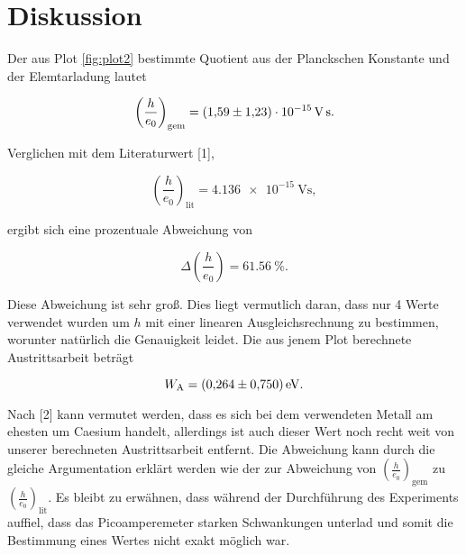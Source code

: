\section{Diskussion}
\label{sec:Diskussion}

Der aus Plot \ref{fig:plot2} bestimmte Quotient aus der Planckschen Konstante und der Elemtarladung lautet 

\begin{equation*}
\left(\frac{h}{e_0}\right)_\text{gem} = \SI{1.59+-1.23e-15}{\volt\second}.
\end{equation*}

Verglichen mit dem Literaturwert [1],

\begin{equation*}
\left(\frac{h}{e_0}\right)_\text{lit} = \SI{4.136e-15}{\volt\second},
\end{equation*}

ergibt sich eine prozentuale Abweichung von

\begin{equation*}
\Delta\left(\frac{h}{e_0}\right) = \SI{61.56}{\percent}.
\end{equation*}

Diese Abweichung ist sehr groß. Dies liegt vermutlich daran, dass nur 4 Werte 
verwendet wurden um $h$ mit einer linearen Ausgleichsrechnung zu bestimmen, worunter
natürlich die Genauigkeit leidet. 
Die aus jenem Plot berechnete Austrittsarbeit beträgt 

\begin{equation*}
W_\text{A} = \SI{0.264+-0.750}{\eV}.
\end{equation*}

Nach [2] kann vermutet werden, dass es sich bei dem verwendeten Metall am ehesten um 
Caesium handelt, allerdings ist auch dieser Wert noch recht weit von unserer berechneten
Austrittsarbeit entfernt. Die Abweichung kann durch die gleiche Argumentation erklärt werden
wie der zur Abweichung von $\left(\frac{h}{e_0}\right)_\text{gem}$ zu $\left(\frac{h}{e_0}\right)_\text{lit}$.
Es bleibt zu erwähnen, dass während der Durchführung des Experiments auffiel, dass das Picoamperemeter
starken Schwankungen unterlad und somit die Bestimmung eines Wertes nicht exakt möglich war. 
